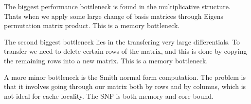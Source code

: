 \begin{DoxyItemize}
\item The biggest performance bottleneck is found in the multiplicative structure. That\textquotesingle{}s when we apply some large change of basis matrices through Eigen\textquotesingle{}s permutation matrix product. This is a memory bottleneck.
\item The second biggest bottleneck lies in the transfering very large differentials. To transfer we need to delete certain rows of the matrix, and this is done by copying the remaining rows into a new matrix. This is a memory bottleneck.
\item A more minor bottleneck is the Smith normal form computation. The problem is that it involves going through our matrix both by rows and by columns, which is not ideal for cache locality. The S\+NF is both memory and core bound. 
\end{DoxyItemize}